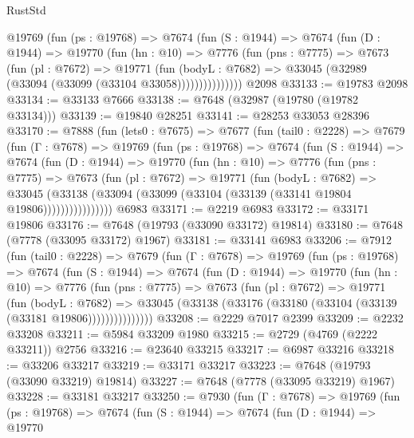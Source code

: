 \begin{lexlean}{RustStd}
\begin{coremodule}
{\begin{coremodule}
{{{{{{{{{{{{{{{{{{{{{{{{{{{{{{{{{{{{{{{{{{{{{{{{{{{{{          @19769
            (fun (ps : @19768) =>
            @7674
              (fun (S : @1944) =>
              @7674
                (fun (D : @1944) =>
                @19770
                  (fun (hn : @10) =>
                  @7776
                    (fun (pns : @7775) =>
                    @7673
                      (fun (pl : @7672) =>
                      @19771
                        (fun (bodyL : @7682) =>
                        @33045 (@32989 (@33094 (@33099 (@33104 @33058)))))))))))))))
    @2098
@33133 := @19783 @2098
@33134 := @33133 @7666
@33138 := @7648 (@32987 (@19780 (@19782 @33134)))
@33139 := @19840 @28251
@33141 := @28253 @33053 @28396
@33170 := @7888
    (fun (lets0 : @7675) =>
    @7677
      (fun (tail0 : @2228) =>
      @7679
        (fun (Γ : @7678) =>
        @19769
          (fun (ps : @19768) =>
          @7674
            (fun (S : @1944) =>
            @7674
              (fun (D : @1944) =>
              @19770
                (fun (hn : @10) =>
                @7776
                  (fun (pns : @7775) =>
                  @7673
                    (fun (pl : @7672) =>
                    @19771
                      (fun (bodyL : @7682) =>
                      @33045
                        (@33138
                          (@33094 (@33099 (@33104 (@33139 (@33141 @19804 @19806))))))))))))))))
    @6983
@33171 := @2219 @6983
@33172 := @33171 @19806
@33176 := @7648 (@19793 (@33090 @33172) @19814)
@33180 := @7648 (@7778 (@33095 @33172) @1967)
@33181 := @33141 @6983
@33206 := @7912
    (fun (tail0 : @2228) =>
    @7679
      (fun (Γ : @7678) =>
      @19769
        (fun (ps : @19768) =>
        @7674
          (fun (S : @1944) =>
          @7674
            (fun (D : @1944) =>
            @19770
              (fun (hn : @10) =>
              @7776
                (fun (pns : @7775) =>
                @7673
                  (fun (pl : @7672) =>
                  @19771
                    (fun (bodyL : @7682) =>
                    @33045 (@33138 (@33176 (@33180 (@33104 (@33139 (@33181 @19806)))))))))))))))
@33208 := @2229 @7017 @2399
@33209 := @2232 @33208
@33211 := @5984 @33209 @1980
@33215 := @2729 (@4769 (@2222 @33211)) @2756
@33216 := @23640 @33215
@33217 := @6987 @33216
@33218 := @33206 @33217
@33219 := @33171 @33217
@33223 := @7648 (@19793 (@33090 @33219) @19814)
@33227 := @7648 (@7778 (@33095 @33219) @1967)
@33228 := @33181 @33217
@33250 := @7930
    (fun (Γ : @7678) =>
    @19769
      (fun (ps : @19768) =>
      @7674
        (fun (S : @1944) =>
        @7674
          (fun (D : @1944) =>
          @19770
}}}}}}}}}}}}}}}}}}}}}}}}}}}}}}}}}}}}}}}}}}}}}}}}}}}}}
\end{coremodule}}
\end{coremodule}
\end{lexlean}
